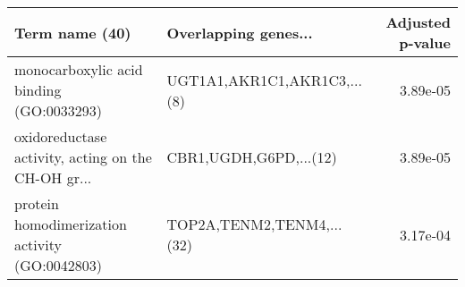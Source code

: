 \begin{tabular}{llr}
\toprule
                                    Term name (40) &        Overlapping genes... &  Adjusted p-value \\
\midrule
          monocarboxylic acid binding (GO:0033293) & UGT1A1,AKR1C1,AKR1C3,...(8) &          3.89e-05 \\
oxidoreductase activity, acting on the CH-OH gr... &      CBR1,UGDH,G6PD,...(12) &          3.89e-05 \\
    protein homodimerization activity (GO:0042803) &   TOP2A,TENM2,TENM4,...(32) &          3.17e-04 \\
\bottomrule
\end{tabular}
